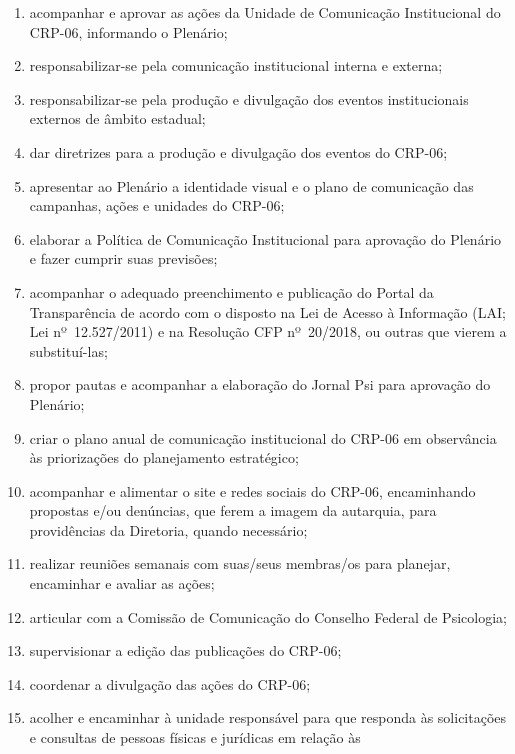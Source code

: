 \begin{enumerate}

  \item
        acompanhar e aprovar as ações da Unidade de Comunicação Institucional
        do CRP-06, informando o Plenário;
  \item
        responsabilizar-se pela comunicação institucional interna e externa;
  \item
        responsabilizar-se pela produção e divulgação dos eventos
        institucionais externos de âmbito estadual;
  \item
        dar diretrizes para a produção e divulgação dos eventos do CRP-06;
  \item
        apresentar ao Plenário a identidade visual e o plano de comunicação
        das campanhas, ações e unidades do CRP-06;
  \item
        elaborar a Política de Comunicação Institucional para aprovação do
        Plenário e fazer cumprir suas previsões;
  \item
        acompanhar o adequado preenchimento e publicação do Portal da
        Transparência de acordo com o disposto na Lei de Acesso à Informação
        (LAI; Lei nº~12.527/2011) e na Resolução CFP nº~20/2018, ou outras que
        vierem a substituí-las;
  \item
        propor pautas e acompanhar a elaboração do Jornal Psi para aprovação
        do Plenário;
  \item
        criar o plano anual de comunicação institucional do CRP-06 em
        observância às priorizações do planejamento estratégico;
  \item
        acompanhar e alimentar o site e redes sociais do CRP-06, encaminhando
        propostas e/ou denúncias, que ferem a imagem da autarquia, para
        providências da Diretoria, quando necessário;
  \item
        realizar reuniões semanais com suas/seus membras/os para planejar,
        encaminhar e avaliar as ações;
  \item
        articular com a Comissão de Comunicação do Conselho Federal de
        Psicologia;
  \item
        supervisionar a edição das publicações do CRP-06;
  \item
        coordenar a divulgação das ações do CRP-06;
  \item
        acolher e encaminhar à unidade responsável para que responda às
        solicitações e consultas de pessoas físicas e jurídicas em relação às

\end{enumerate}
